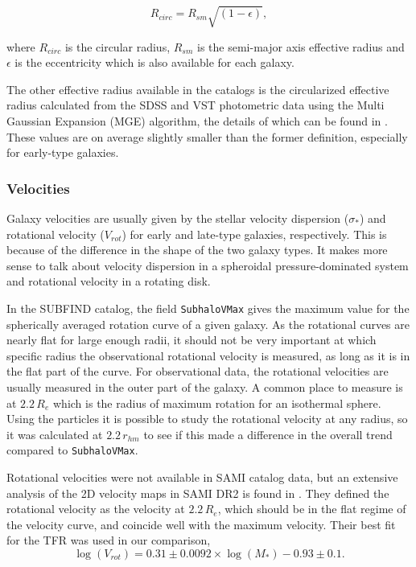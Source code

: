 \begin{equation}
   R_{circ} = R_{sm}\sqrt{(1-\epsilon)},
\end{equation}

where $R_{circ}$ is the circular radius, $R_{sm}$ is the semi-major axis effective radius and $\epsilon$ is the eccentricity which is also available for each galaxy.

The other effective radius available in the catalogs is the circularized effective radius calculated from the SDSS and VST photometric data using the Multi Gaussian Expansion (MGE) algorithm, the details of which can be found in \textcite{Scott2021}. These values are on average slightly smaller than the former definition, especially for early-type galaxies.

\subsubsection{Velocities}

Galaxy velocities are usually given by the stellar velocity dispersion ($\sigma_*$) and rotational velocity ($V_{rot}$) for early and late-type galaxies, respectively. This is because of the difference in the shape of the two galaxy types. It makes more sense to talk about velocity dispersion in a spheroidal pressure-dominated system and rotational velocity in a rotating disk.

In the SUBFIND catalog, the field \texttt{SubhaloVMax} gives the maximum value for the spherically averaged rotation curve of a given galaxy. As the rotational curves are nearly flat for large enough radii, it should not be very important at which specific radius the observational rotational velocity is measured, as long as it is in the flat part of the curve. For observational data, the rotational velocities are usually measured in the outer part of the galaxy. A common place to measure is at $2.2\, R_e$ which is the radius of maximum rotation for an isothermal sphere. Using the particles it is possible to study the rotational velocity at any radius, so it was calculated at $2.2\, r_{hm}$ to see if this made a difference in the overall trend compared to \texttt{SubhaloVMax}. 

Rotational velocities were not available in SAMI catalog data, but an extensive analysis of the 2D velocity maps in SAMI DR2 is found in \textcite{Bloom2017}. They defined the rotational velocity as the velocity at $2.2\, R_e$, which should be in the flat regime of the velocity curve, and coincide well with the maximum velocity. Their best fit for the TFR was used in our comparison, 
\begin{equation}
	\log(V_{rot}) = 0.31 \pm 0.0092 \times \log(M_*)-0.93 \pm 0.1.
\end{equation}

